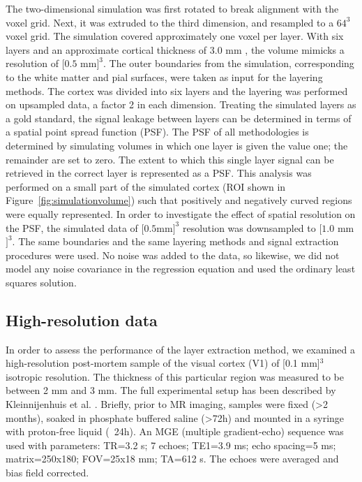 The two-dimensional simulation was first rotated to break alignment with the voxel grid. Next, it was extruded to the third dimension, and resampled to a $64^3$ voxel grid. The simulation covered approximately one voxel per layer. With six layers and an approximate cortical thickness of 3.0 mm \cite{Zilles1990,Fischl2000}, the volume mimicks a resolution of $[0.5$ mm$]^3$. The outer boundaries from the simulation, corresponding to the white matter and pial surfaces, were taken as input for the layering methods. The cortex was divided into six layers and the layering was performed on upsampled data, a factor 2 in each dimension. Treating the simulated layers as a gold standard, the signal leakage between layers can be determined in terms of a spatial point spread function (PSF). The PSF of all methodologies is determined by simulating volumes in which one layer is given the value one; the remainder are set to zero. The extent to which this single layer signal can be retrieved in the correct layer is represented as a PSF. This analysis was performed on a small part of the simulated cortex (ROI shown in Figure~\ref{fig:simulationvolume}) such that positively and negatively curved regions were equally represented. In order to investigate the effect of spatial resolution on the PSF, the simulated data of $[0.5 $mm$]^3$ resolution was downsampled to $[1.0$ mm$]^3$. The same boundaries and the same layering methods and signal extraction procedures were used. No noise was added to the data, so likewise, we did not model any noise covariance in the regression equation and used the ordinary least squares solution.


\subsection{High-resolution data}
In order to assess the performance of the layer extraction method, we examined a high-resolution post-mortem sample of the visual cortex (V1) of [0.1 mm]$^3$ isotropic resolution. The thickness of this particular region was measured to be between 2 mm and 3 mm. The full experimental setup has been described by Kleinnijenhuis et al. \cite{Kleinnijenhuis2013}. Briefly, prior to MR imaging, samples were fixed (>2 months), soaked in phosphate buffered saline (>72h) and mounted in a syringe with proton-free liquid (~24h). An MGE (multiple gradient-echo) sequence was used with parameters: TR=3.2 s; 7 echoes; TE1=3.9 ms; echo spacing=5 ms; matrix=250x180; FOV=25x18 mm; TA=612 s. The echoes were averaged and bias field corrected.

